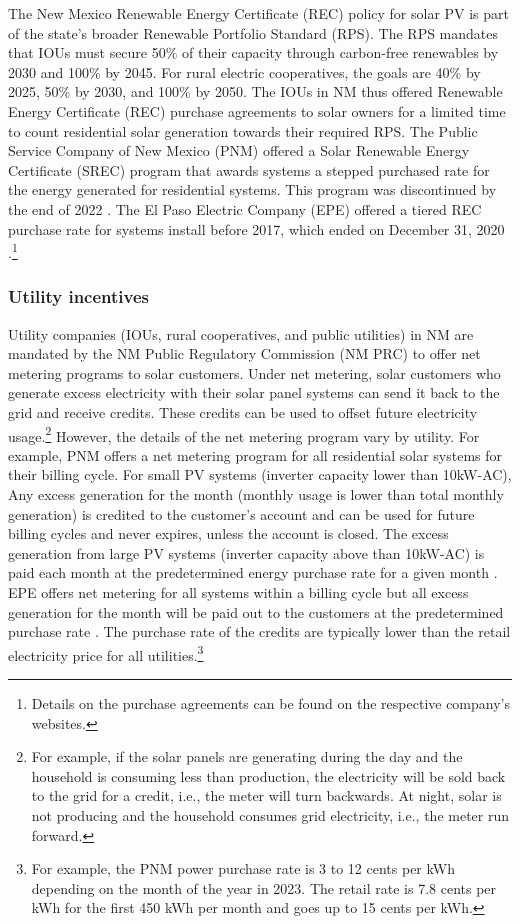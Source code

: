 \documentclass[12pt,twoside,letterpaper]{article}
\begin{document}
The New Mexico Renewable Energy Certificate (REC) policy for solar PV is part of the state's broader Renewable Portfolio Standard (RPS). The RPS mandates that IOUs must secure 50\% of their capacity through carbon-free renewables by 2030 and 100\% by 2045. For rural electric cooperatives, the goals are 40\% by 2025, 50\% by 2030, and 100\% by 2050. The IOUs in NM thus offered Renewable Energy Certificate (REC) purchase agreements to solar owners for a limited time to count residential solar generation towards their required RPS. The Public Service Company of New Mexico (PNM) offered a Solar Renewable Energy Certificate (SREC) program that awards systems a stepped purchased rate for the energy generated for residential systems. This program was discontinued by the end of 2022 \parencite{pnmrec}. The El Paso Electric Company (EPE) offered a tiered REC purchase rate for systems install before 2017, which ended on December 31, 2020 \parencite{eperec, eperecmid}.\footnote{Details on the purchase agreements can be found on the respective company's websites.}

\subsubsection{Utility incentives}

Utility companies (IOUs, rural cooperatives, and public utilities) in NM are mandated by the NM Public Regulatory Commission (NM PRC) to offer net metering programs to solar customers. Under net metering, solar customers who generate excess electricity with their solar panel systems can send it back to the grid and receive credits. These credits can be used to offset future electricity usage.\footnote{For example, if the solar panels are generating during the day and the household is consuming less than production, the electricity will be sold back to the grid for a credit, i.e., the meter will turn backwards. At night, solar is not producing and the household consumes grid electricity, i.e., the meter run forward.} However, the details of the net metering program vary by utility. For example, PNM offers a net metering program for all residential solar systems for their billing cycle. For small PV systems (inverter capacity lower than 10kW-AC), Any excess generation for the month (monthly usage is lower than total monthly generation) is credited to the customer's account and can be used for future billing cycles and never expires, unless the account is closed. The excess generation from large PV systems (inverter capacity above than 10kW-AC) is paid each month at the predetermined energy purchase rate for a given month \parencite{pnmnet}. EPE offers net metering for all systems within a billing cycle but all excess generation for the month will be paid out to the customers at the predetermined purchase rate \parencite{epenet,epenetmid}.  The purchase rate of the credits are typically lower than the retail electricity price for all utilities.\footnote{For example, the PNM power purchase rate is 3 to 12 cents per kWh depending on the month of the year in 2023. The retail rate is 7.8 cents per kWh for the first 450 kWh per month and goes up to 15 cents per kWh.}
\end{document}
